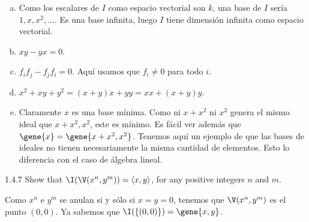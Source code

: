 \documentclass[twoside]{article}
\begin{document}
\begin{solucion}
\begin{enumerate}[a.]
\item Como los escalares de $I$ como espacio vectorial son $k$, una base de $I$ sería $1,x,x^2,\dots$.
Es una base infinita, luego $I$ tiene dimensión infinita como espacio vectorial.
\item $xy-yx = 0$.
\item $f_i f_j - f_j f_i = 0$. Aquí usamos que $f_i \neq 0$ para todo $i$.
\item $x^2+xy+y^2 = (x+y)x+yy = xx+(x+y)y$.
\item Claramente $x$ es una base mínima.
Como ni $x+x^2$ ni $x^2$ genera el mismo ideal que $x+x^2,x^2$, este es mínimo.
Es fácil ver además que $\gene{x}=\gene{x+x^2,x^2}$.
Tenemos aquí un ejemplo de que las bases de ideales no tienen necesariamente la misma cantidad de elementos.
Esto lo diferencia con el caso de álgebra lineal.
\end{enumerate}
\end{solucion}

\newpage

\begin{ejercicio}{1.4.7}
Show that $\I(\V(x^n,y^m))=\langle x,y \rangle$, for any positive integers $n$ and $m$.
\end{ejercicio}
\begin{solucion}
Como $x^n$ e $y^m$ se anulan si y sólo si $x=y=0$, tenemos que $\V(x^n,y^m)$ es el punto $(0,0)$.
Ya sabemos que $\I(\{(0,0)\}) = \gene{x,y}$.
\end{solucion}

\newpage
\end{document}
